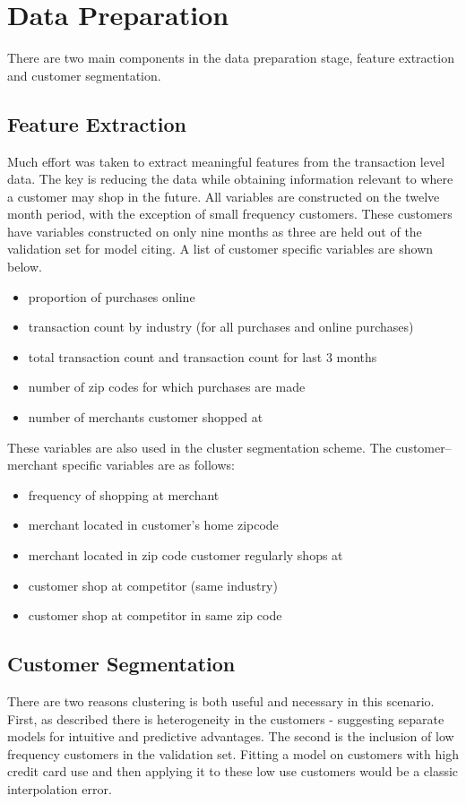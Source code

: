 \documentclass[12pt]{article} %
\begin{document}
\section{Data Preparation}
There are two main components in the data preparation stage, feature extraction and customer segmentation.
\subsection{Feature Extraction}
Much effort was taken to extract meaningful features from the transaction level data.  The key is reducing the data while obtaining information relevant to where a customer may shop in the future.  All variables are constructed on the twelve month period, with the exception of small frequency customers.  These customers have variables constructed on only nine months as three are held out of the validation set for model citing.  A list of customer specific variables are shown below.
\small
\begin{itemize}
\item proportion of purchases online 
\item transaction count by industry (for all purchases and online purchases)
\item total transaction count and transaction count for last 3 months
\item number of zip codes for which purchases are made
\item number of merchants customer shopped at
\end{itemize}
\normalsize
These variables are also used in the cluster segmentation scheme.   The customer-- merchant specific variables are as follows:
\small
\begin{itemize}
\item frequency of shopping at merchant
\item merchant located in customer's home zipcode
\item merchant located in zip code customer regularly shops at
\item customer shop at competitor (same industry)
\item customer shop at competitor in same zip code
\end{itemize}
\normalsize

\subsection{Customer Segmentation}
There are two reasons clustering is both useful and necessary in this scenario.  First, as described there is heterogeneity in the customers - suggesting separate models for intuitive and predictive advantages.  The second is the inclusion of low frequency customers in the validation set.  Fitting a model on customers with high credit card use and then applying it to these low use customers would be a classic interpolation error.
\end{document}
